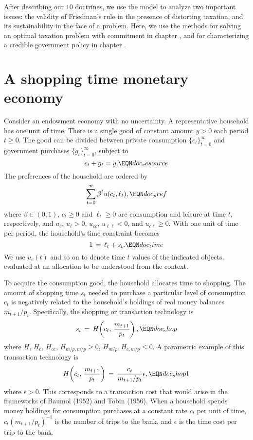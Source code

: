   After describing our $10$ doctrines, we  use the model to analyze
two important issues: the validity of Friedman's rule in the
presence of distorting taxation, and its sustainability in the
face of a  problem. Here, we use the methods
for solving an optimal taxation problem with commitment in chapter
, and for characterizing a credible government policy
in chapter .




\section{A shopping time monetary economy}
Consider an endowment economy with no uncertainty.
A representative household has one unit of time.
There is a single good  of constant amount $y>0$ each period $t \geq 0$.
The good can be divided between private consumption $\{c_{t}\}_{t=0}^\infty$
and government purchases $\{g_t\}_{t=0}^\infty$, subject to
$$ c_{t} + g_t = y.                   \EQN doc_resource$$
The preferences of the household are ordered by
$$ \sum_{t=0}^\infty \beta^t u(c_{t},\ell_t)  ,        \EQN doc_pref$$
where $\beta \in (0,1)$, $c_t\geq 0$ and $\ell_t\geq 0$ are
consumption and leisure at time $t$, respectively, and
$u_c$, $u_\ell > 0$, $u_{cc}$, $u_{\ell \ell} < 0$, and $u_{c \ell} \geq 0$.
With one unit of time per period, the household's
time constraint becomes
$$1\,=\, \ell_t + s_t.                \EQN doc_time
$$
We use $u_c(t)$ and so on to denote  time $t$ values of
the indicated objects, evaluated at an allocation to be understood from the
context.


To acquire the consumption good,
the household allocates time to shopping.
The amount of shopping time $s_t$ needed
to purchase a particular level of consumption $c_t$ is negatively related
to the household's holdings of real money balances $m_{t+1}/p_t$.
Specifically, the shopping or transaction technology is
$$
s_t\,=\,H\!\left(c_t,\, {m_{t+1} \over p_t} \right),             \EQN doc_shop
$$
where $H,\, H_c,\, H_{cc},\, H_{m/p,m/p}\geq 0$, $H_{m/p}, H_{c,m/p}\leq 0$.  A parametric example of this
transaction technology is
$$
H\!\left(c_t,\, {m_{t+1} \over p_t} \right) \,=\, {c_t \over m_{t+1}/p_t }
\epsilon,
       \EQN doc_shop1 $$
where $\epsilon >0$.  This corresponds to a transaction cost that would
arise in the frameworks of Baumol (1952) and Tobin (1956).
When a household spends money holdings for consumption purchases at a
constant rate $c_t$ per unit of time, $c_t (m_{t+1}/p_t)^{-1}$ is the
number of trips to the bank, and $\epsilon$ is the time cost per trip
to the bank.
 

